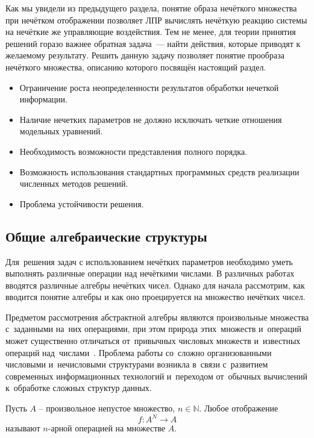 Как мы увидели из предыдущего раздела, понятие образа нечёткого множества при нечётком отображении позволяет ЛПР вычислять нечёткую реакцию системы на нечёткие же управляющие воздействия. Тем не менее, для теории принятия решений горазо важнее обратная задача~--- найти действия, которые приводят к желаемому результату. Решить данную задачу позволяет понятие прообраза нечёткого множества, описанию которого посвящён настоящий раздел.

\begin{itemize}
	\item Ограничение роста неопределенности результатов обработки нечеткой информации.
	\item Наличие нечетких параметров не должно исключать четкие отношения модельных уравнений.
	\item Необходимость возможности представления полного порядка.
	\item Возможность использования стандартных программных средств реализации численных методов решений.
	\item Проблема устойчивости решения.
\end{itemize}

\subsection{Общие алгебраические структуры}

Для~решения задач с использованием нечётких параметров необходимо уметь выполнять различные операции над нечёткими числами. В различных работах вводятся различные алгебры нечётких чисел. Однако для начала рассмотрим, как вводится понятие алгебры и как оно проецируется на множество нечётких чисел.

Предметом рассмотрения абстрактной алгебры являются произвольные множества с~заданными на~них операциями, при этом природа этих~множеств и~операций может существенно отличаться от~привычных числовых множеств и~известных операций над~числами~\cite{Bauman_DM}. Проблема работы со~сложно организованными числовыми и~нечисловыми структурами возникла в~связи с~развитием современных информационных технологий и~переходом от~обычных вычислений к~обработке сложных структур данных.

\begin{mydef}
Пусть $A$ – произвольное непустое множество, $n\in \mathbb{N}$. Любое отображение 
\begin{equation*}
	f:A^N \to A
\end{equation*}
называют $n$-арной операцией на множестве $A$.
\end{mydef}


